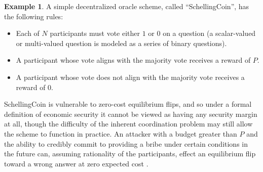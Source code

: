 \documentclass[11pt,a4paper]{article}
\theoremstyle{plain}
\theoremstyle{definition}
\newtheorem{exmp}{Example}[section]
\theoremstyle{remark}
\begin{document}
\begin{exmp}
A simple decentralized oracle scheme, called ``SchellingCoin'', has the following rules:
\begin{itemize}
\item
Each of $N$ participants must vote either $1$ or $0$ on a question (a scalar-valued or multi-valued question is modeled as a series of binary questions).
\item
A participant whose vote aligns with the majority vote receives a reward of $P$.
\item
A participant whose vote does not align with the majority vote receives a reward of $0$.
\end{itemize}
SchellingCoin is vulnerable to zero-cost equilibrium flips, and so under a formal definition of economic security it cannot be viewed as having any security margin at all, though the difficulty of the inherent coordination problem may still allow the scheme to function in practice. An attacker with a budget greater than $P$ and the ability to credibly commit to providing a bribe under certain conditions in the future can, assuming rationality of the participants, effect an equilibrium flip toward a wrong answer at zero expected cost \cite{pepsilon}.
\end{exmp}
\end{document}
